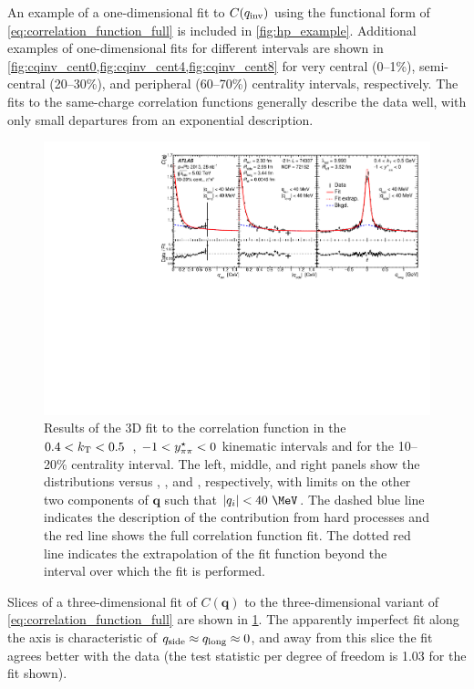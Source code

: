 An example of a one-dimensional fit to $C(q_{\mathrm{inv}})$ using the functional form of \cref{eq:correlation_function_full} is included in \cref{fig:hp_example}.
Additional examples of one-dimensional fits for different \kt intervals are shown in \cref{fig:cqinv_cent0,fig:cqinv_cent4,fig:cqinv_cent8} for very central (0--1\%), semi-central (20--30\%), and peripheral (60--70\%) centrality intervals, respectively.
The fits to the same-charge correlation functions generally describe the data well, with only small departures from an exponential description.


\begin{figure}[h]
\centering
\includegraphics[width=0.97\linewidth]{Cqosl_slices_cent3_e3_kt3_ys1.pdf}
\caption{Results of the 3D fit to the correlation function in the $0.4 < k_\mathrm{T} < 0.5$~\GeV, $-1 < y^{\star}_{\pi\pi} < 0$ kinematic intervals and for the 10--20\% centrality interval.
The left, middle, and right panels show the distributions versus \qout, \qside, and \qlong, respectively, with limits on the other two components of $\mathbf{q}$ such that $|q_i| < 40~\MeV$.
The dashed blue line indicates the description of the contribution from hard processes and the red line shows the full correlation function fit.
The dotted red line indicates the extrapolation of the fit function beyond the interval over which the fit is performed.
}
\label{fig:cqosl_slices}
\end{figure}


Slices of a three-dimensional fit of $C(\mathbf{q})$ to the three-dimensional variant of \cref{eq:correlation_function_full} are shown in \cref{fig:cqosl_slices}.
The apparently imperfect fit along the \qout axis is characteristic of $q_{\mathrm{side}} \approx q_{\mathrm{long}} \approx 0$, and away from this slice the  fit agrees better with the data (the test statistic per degree of freedom is 1.03 for the fit shown). 


